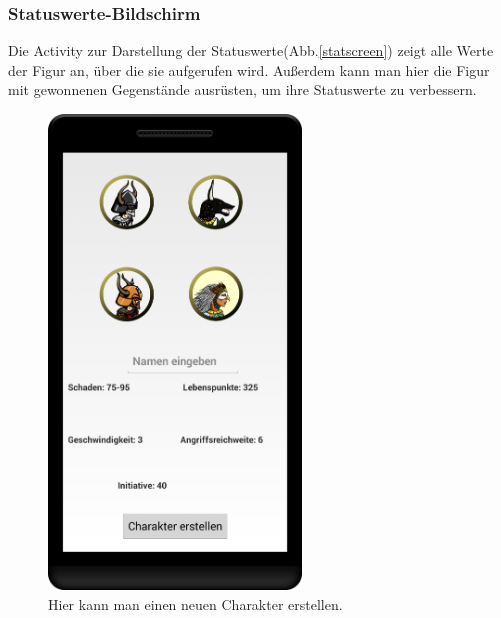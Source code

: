 \documentclass[extern,palatino]{cgBA}
\begin{document}
\subsubsection{Statuswerte-Bildschirm}
Die Activity zur Darstellung der Statuswerte(Abb.\ref{statscreen}) zeigt alle Werte der Figur an, über die sie aufgerufen wird. Außerdem kann man hier die Figur mit gewonnenen Gegenstände ausrüsten, um ihre Statuswerte zu verbessern.
\newpage
\begin{figure}[H] 
		\centering
		\includegraphics[width=0.6\textwidth]{createcharscreen.png}
		\caption{Hier kann man einen neuen Charakter erstellen.}
		\label{createcharscreen}
\end{figure} 
\end{document}
